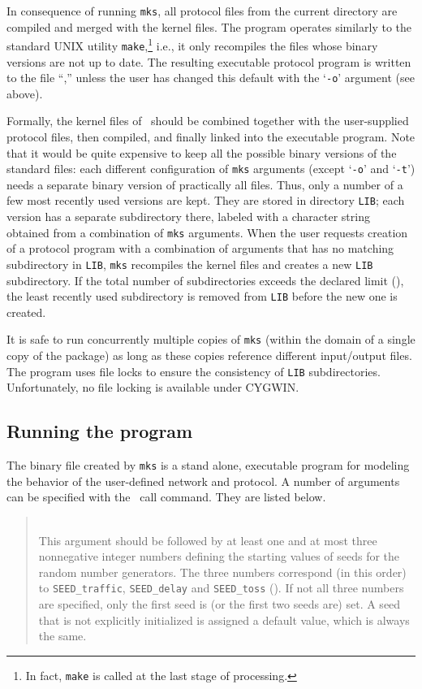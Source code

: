 In consequence of running {\tt mks}, all protocol files from the current
directory are compiled and merged with the kernel files.
The program operates similarly to the standard UNIX utility
{\tt make},\footnote{In fact, {\tt make} is called at the last
stage of processing.} i.e.,
it only recompiles the files whose binary versions are not up to date.
The resulting executable protocol program is written to the file
``\smurphtts,'' unless the user has changed this default with the
`{\tt -o}' argument (see above).

Formally, the kernel files of \smurph\ should be combined
together with the user-supplied protocol files, then compiled, and finally
linked into the executable program.
Note that it would be quite expensive to keep all the possible binary versions
of the standard files: each different configuration of {\tt mks} arguments
(except `{\tt -o}' and `{\tt -t}')
needs a separate binary version of practically all files.
Thus, only a number of a few most recently used versions are kept.
They are stored in directory {\tt LIB}; each version has a separate
subdirectory there, labeled with a character string obtained from a
combination of {\tt mks} arguments.
When the user requests creation of a protocol program with a combination
of arguments that has no matching subdirectory in {\tt LIB}, {\tt mks}
recompiles the kernel files and creates a new {\tt LIB} subdirectory.
If the total number of subdirectories exceeds the declared limit
(), the least recently used subdirectory is removed from
{\tt LIB} before the new one is created.

It is safe to run concurrently
multiple copies of {\tt mks} (within the domain of a single
copy of the package) as long as these copies reference different input/output
files.
The program uses file locks to ensure the consistency of {\tt LIB}
subdirectories.
Unfortunately, no file locking is available under CYGWIN.

\subsection{Running the program}
\label{rm_un_ru}

The binary file created by {\tt mks} is a stand alone, executable
program for modeling the behavior of the user-defined network and
protocol.
A number of arguments can be specified with the \smurphtts\ call
command.
They are listed below.

\medskip

\begin{quote}
\noindent{}\\ \hspace{0in}
This argument should be followed by at least one and at most three
nonnegative integer numbers defining the starting values of seeds for
the random number generators.
The three numbers correspond (in this order) to {\tt SEED\_traffic},
{\tt SEED\_delay} and {\tt SEED\_toss} ().
If not all three numbers are specified, only the first seed is (or the first
two seeds are) set.
A seed that is not explicitly initialized is assigned a default value, which
is always the same.
\end{quote}

